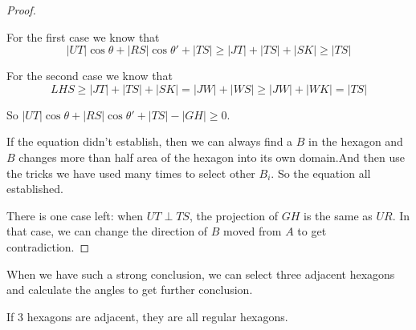 \begin{proof}
\begin{center}
	\end{center}
	
	For the first case we know that 
	\[ |UT|\cos\theta+|RS|\cos\theta' + |TS| \geq |JT| + |TS| + |SK|
	\geq|TS| \]
	
	For the second case we know that
	\[ LHS\geq|JT| + |TS| + |SK| = |JW| + |WS|\geq |JW| + 
	|WK| = |TS| \]
	
	So $|UT|\cos\theta+|RS|\cos\theta'+|TS|-|GH|\geq 0$.
	
	If the equation didn't establish, then we can always find a $B$ 
	in the hexagon and $B$ changes more than half area of the hexagon 
	into its own domain.And then use the tricks we have used many 
	times to select other $B_i$. 
	So the equation all established.
	
	There is one case left: when $UT\perp TS$, the projection of $GH$ 
	is the same as $UR$. In that case, we can change the direction of $B$ 
	moved from $A$ to get contradiction. 
\end{proof}

When we have such a strong conclusion, we can select three adjacent 
hexagons and calculate the angles to get further conclusion.

\begin{thm}
	If 3 hexagons are adjacent, they are all regular hexagons.
\end{thm}

